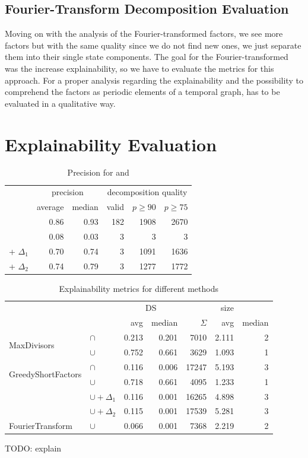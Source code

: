 \subsection{Fourier-Transform Decomposition Evaluation}
\label{ch:Evaluation:decomposition-quality:fourier}
Moving on with the analysis of the Fourier-transformed factors, we see more factors but with the same quality since we do not find new ones, we just separate them into their  single state components.
The goal for the Fourier-transformed \orDecomp was the increase explainability, so we have to evaluate the metrics for this approach.
For a proper analysis regarding the explainability and the possibility to comprehend the factors as periodic elements of a temporal graph, has to be evaluated in a qualitative way.

\newpage
\section{Explainability Evaluation}
\label{ch:Evaluation:explainability}


\begin{table}[h]
	\centering
	\begin{tabular}{l|rr|rrr}
		& \multicolumn{2}{c}{precision} & \multicolumn{3}{c}{decomposition quality} \\
		& average & median & valid & $p \geq 90$ & $p \geq 75$ \\
		\hline
		\andDecomp & 0.86 & 0.93 &  182 & 1908 & 2670\\
		\orDecomp & 0.08 & 0.03 & 3 & 3 & 3 \\
		\orDecomp + $\Delta_1$ & 0.70 & 0.74 & 3 & 1091 & 1636  \\
		\orDecomp + $\Delta_2$ & 0.74 & 0.79 & 3 & 1277 & 1772 \\
	\end{tabular}
	\caption{Precision for \andDecomp and \orDecomp}
	\label{tab:eval-precision}
\end{table}


\begin{table}[h]
	\centering
	\begin{tabular}{ll|rr|rrr}
		& &  \multicolumn{2}{c}{DS} & \multicolumn{3}{c}{size}  \\
		& & avg & median & $\Sigma$ & avg & median\\
		\hline
		\multirow{2}{*}{MaxDivisors} & $\cap$ & 0.213 & 0.201 & 7010 & 2.111 & 2 \\
		& $\cup$ & 0.752 & 0.661 & 3629 & 1.093 & 1 \\
		\hline
		\multirow{2}{*}{GreedyShortFactors} & $\cap$  & 0.116 & 0.006 & 17247 & 5.193 & 3 \\
		& $\cup$ & 0.718 & 0.661 & 4095 & 1.233 & 1 \\
		& $\cup + \Delta_1$ & 0.116 & 0.001  & 16265 & 4.898 & 3\\
		& $\cup + \Delta_2$ & 0.115 & 0.001  & 17539 & 5.281 & 3\\
		\hline
		FourierTransform & $\cup$ & 0.066 & 0.001 & 7368 & 2.219 & 2 \\
	\end{tabular}
	\caption{Explainability metrics for different methods}
	\label{tab:eval-metric}
\end{table}


TODO: explain
